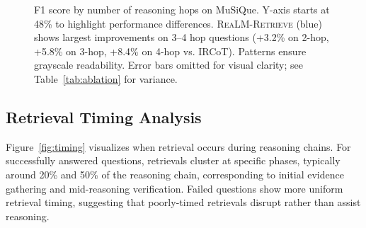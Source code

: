 \documentclass[sigconf,natbib=true]{acmart}
\newcommand{\methodname}{\textsc{ReaLM-Retrieve}}
\begin{document}
\begin{figure}[t]
	\caption{F1 score by number of reasoning hops on MuSiQue. Y-axis starts at 48\% to highlight performance differences. \methodname{} (blue) shows largest improvements on 3--4 hop questions (+3.2\% on 2-hop, +5.8\% on 3-hop, +8.4\% on 4-hop vs. IRCoT). Patterns ensure grayscale readability. Error bars omitted for visual clarity; see Table~\ref{tab:ablation} for variance.}
	\label{fig:complexity}
\end{figure}

\subsection{Retrieval Timing Analysis}
Figure~\ref{fig:timing} visualizes when retrieval occurs during reasoning chains. For successfully answered questions, retrievals cluster at specific phases, typically around 20\% and 50\% of the reasoning chain, corresponding to initial evidence gathering and mid-reasoning verification. Failed questions show more uniform retrieval timing, suggesting that poorly-timed retrievals disrupt rather than assist reasoning.
\end{document}
